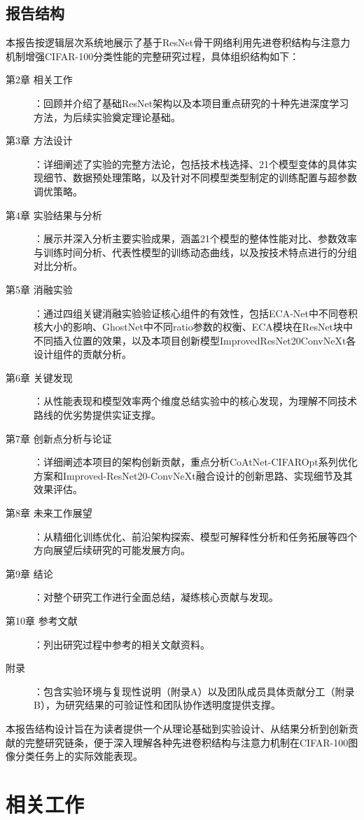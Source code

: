 \documentclass[a4paper]{article}
\begin{document}
\subsection{报告结构}
本报告按逻辑层次系统地展示了基于ResNet骨干网络利用先进卷积结构与注意力机制增强CIFAR-100分类性能的完整研究过程，具体组织结构如下：
\begin{description}
    \item[第2章 相关工作]：回顾并介绍了基础ResNet架构以及本项目重点研究的十种先进深度学习方法，为后续实验奠定理论基础。
    \item[第3章 方法设计]：详细阐述了实验的完整方法论，包括技术栈选择、21个模型变体的具体实现细节、数据预处理策略，以及针对不同模型类型制定的训练配置与超参数调优策略。
    \item[第4章 实验结果与分析]：展示并深入分析主要实验成果，涵盖21个模型的整体性能对比、参数效率与训练时间分析、代表性模型的训练动态曲线，以及按技术特点进行的分组对比分析。
    \item[第5章 消融实验]：通过四组关键消融实验验证核心组件的有效性，包括ECA-Net中不同卷积核大小的影响、GhostNet中不同ratio参数的权衡、ECA模块在ResNet块中不同插入位置的效果，以及本项目创新模型ImprovedResNet20ConvNeXt各设计组件的贡献分析。
    \item[第6章 关键发现]：从性能表现和模型效率两个维度总结实验中的核心发现，为理解不同技术路线的优劣势提供实证支撑。
    \item[第7章 创新点分析与论证]：详细阐述本项目的架构创新贡献，重点分析CoAtNet-CIFAROpt系列优化方案和Improved-ResNet20-ConvNeXt融合设计的创新思路、实现细节及其效果评估。
    \item[第8章 未来工作展望]：从精细化训练优化、前沿架构探索、模型可解释性分析和任务拓展等四个方向展望后续研究的可能发展方向。
    \item[第9章 结论]：对整个研究工作进行全面总结，凝练核心贡献与发现。
    \item[第10章 参考文献]：列出研究过程中参考的相关文献资料。
    \item[附录]：包含实验环境与复现性说明（附录A）以及团队成员具体贡献分工（附录B），为研究结果的可验证性和团队协作透明度提供支撑。
\end{description}
本报告结构设计旨在为读者提供一个从理论基础到实验设计、从结果分析到创新贡献的完整研究链条，便于深入理解各种先进卷积结构与注意力机制在CIFAR-100图像分类任务上的实际效能表现。

\section{相关工作}
\end{document}
